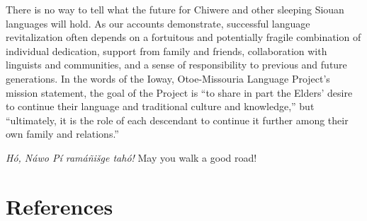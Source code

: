 \documentclass[output=paper]{LSP/langsci}
\begin{document}
There is no way to tell what the future for Chiwere and other sleeping Siouan languages will hold. As our accounts demonstrate, successful language revitalization often depends on a fortuitous and potentially fragile combination of individual dedication, support from family and friends, collaboration with linguists and communities, and a sense of responsibility to previous and future generations. In the words of the Ioway, Otoe-Missouria Language Project's mission statement, the goal of the Project is ``to share in part the Elders' desire to continue their language and traditional culture and knowledge,'' but ``ultimately, it is the role of each descendant to continue it further among their own family and relations.''

\emph{Hó, Náwo Pí ramáñišge tahó!}  May you walk a good road!

\section*{References}
\end{document}
